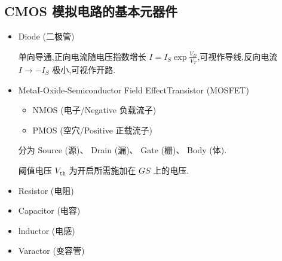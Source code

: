     \subsection{CMOS 模拟电路的基本元器件}
    \begin{itemize}
        \item Diode (二极管)

            单向导通,正向电流随电压指数增长 $I=I_{S}\exp \frac{V_{D}}{V_{T}}$,可视作导线,反向电流 $I\rightarrow -I_{S}$ 极小,可视作开路.
        \item MetaI-Oxide-Semiconductor Field EffectTransistor (MOSFET)
            \begin{itemize}
                \item NMOS (电子/Negative 负载流子)
                \item PMOS (空穴/Positive 正载流子)
            \end{itemize}
            分为 Source (源)、 Drain (漏)、 Gate (栅)、 Body (体).

            阈值电压 $V_{\texttt{th}}$ 为开启所需施加在 $GS$ 上的电压.
        \item Resistor (电阻)
        \item Capacitor (电容)
        \item lnductor (电感)
        \item Varactor (变容管)
    \end{itemize}

